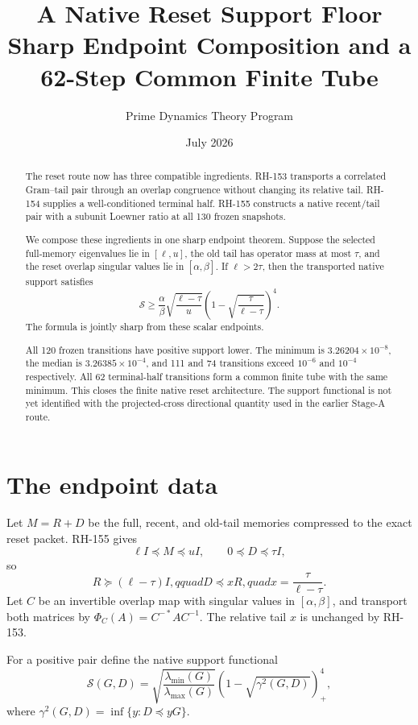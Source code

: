 \documentclass[12pt]{article}
\title{A Native Reset Support Floor\\\large Sharp Endpoint Composition and a 62-Step Common Finite Tube}
\author{Prime Dynamics Theory Program}
\date{July 2026}
\begin{document}
\maketitle

\begin{abstract}
The reset route now has three compatible ingredients.  RH-153 transports a
correlated Gram--tail pair through an overlap congruence without changing its
relative tail.  RH-154 supplies a well-conditioned terminal half.  RH-155
constructs a native recent/tail pair with a subunit Loewner ratio at all 130
frozen snapshots.

We compose these ingredients in one sharp endpoint theorem.  Suppose the
selected full-memory eigenvalues lie in $[\ell,u]$, the old tail has operator
mass at most $\tau$, and the reset overlap singular values lie in
$[\alpha,\beta]$.  If $\ell>2\tau$, then the transported native support
satisfies
\[
 \mathcal S\geq
 \frac{\alpha}{\beta}
 \sqrt{\frac{\ell-\tau}{u}}
 \left(1-\sqrt{\frac{\tau}{\ell-\tau}}\right)^4.
\]
The formula is jointly sharp from these scalar endpoints.

All 120 frozen transitions have positive support lower.  The minimum is
$3.26204\times10^{-8}$, the median is $3.26385\times10^{-4}$, and 111 and
74 transitions exceed $10^{-6}$ and $10^{-4}$ respectively.  All 62
terminal-half transitions form a common finite tube with the same minimum.
This closes the finite native reset architecture.  The support functional is
not yet identified with the projected-cross directional quantity used in the
earlier Stage-A route.
\end{abstract}

\section{The endpoint data}
Let $M=R+D$ be the full, recent, and old-tail memories compressed to the
exact reset packet.  RH-155 gives
\[
 \ell I\preceq M\preceq uI,
 \qquad 0\preceq D\preceq\tau I,
\]
so
\[
 R\succeq(\ell-\tau)I,qquad
 D\preceq xR,quad x=\frac{\tau}{\ell-\tau}.
\]
Let $C$ be an invertible overlap map with singular values in
$[\alpha,\beta]$, and transport both matrices by
$\Phi_C(A)=C^{-*}AC^{-1}$.  The relative tail $x$ is unchanged by RH-153.

For a positive pair define the native support functional
\[
 \mathcal S(G,D)=
 \sqrt{\frac{\lambda_{\min}(G)}{\lambda_{\max}(G)}}
 \left(1-\sqrt{\gamma^2(G,D)}\right)_+^4,
\]
where $\gamma^2(G,D)=\inf\{y:D\preceq yG\}$.
\end{document}
